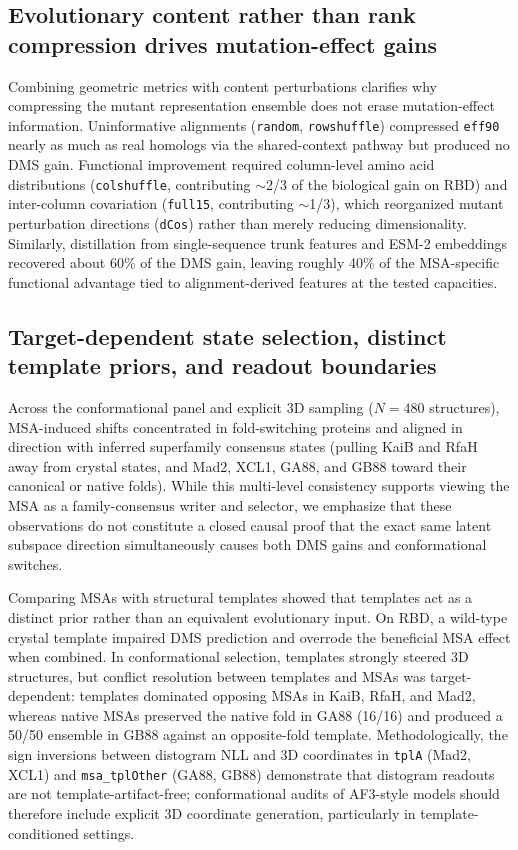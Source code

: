 \documentclass[10pt,a4paper]{article}
\begin{document}
\subsection{Evolutionary content rather than rank compression drives mutation-effect gains}
Combining geometric metrics with content perturbations clarifies why compressing the mutant representation ensemble does not erase mutation-effect information. Uninformative alignments (\texttt{random}, \texttt{rowshuffle}) compressed \texttt{eff90} nearly as much as real homologs via the shared-context pathway but produced no DMS gain. Functional improvement required column-level amino acid distributions (\texttt{colshuffle}, contributing $\sim$2/3 of the biological gain on RBD) and inter-column covariation (\texttt{full15}, contributing $\sim$1/3), which reorganized mutant perturbation directions (\texttt{dCos}) rather than merely reducing dimensionality. Similarly, distillation from single-sequence trunk features and ESM-2 embeddings recovered about 60\% of the DMS gain, leaving roughly 40\% of the MSA-specific functional advantage tied to alignment-derived features at the tested capacities.

\subsection{Target-dependent state selection, distinct template priors, and readout boundaries}
Across the conformational panel and explicit 3D sampling ($N=480$ structures), MSA-induced shifts concentrated in fold-switching proteins and aligned in direction with inferred superfamily consensus states (pulling KaiB and RfaH away from crystal states, and Mad2, XCL1, GA88, and GB88 toward their canonical or native folds). While this multi-level consistency supports viewing the MSA as a family-consensus writer and selector, we emphasize that these observations do not constitute a closed causal proof that the exact same latent subspace direction simultaneously causes both DMS gains and conformational switches.

Comparing MSAs with structural templates showed that templates act as a distinct prior rather than an equivalent evolutionary input. On RBD, a wild-type crystal template impaired DMS prediction and overrode the beneficial MSA effect when combined. In conformational selection, templates strongly steered 3D structures, but conflict resolution between templates and MSAs was target-dependent: templates dominated opposing MSAs in KaiB, RfaH, and Mad2, whereas native MSAs preserved the native fold in GA88 (16/16) and produced a 50/50 ensemble in GB88 against an opposite-fold template. Methodologically, the sign inversions between distogram NLL and 3D coordinates in \texttt{tplA} (Mad2, XCL1) and \texttt{msa\_tplOther} (GA88, GB88) demonstrate that distogram readouts are not template-artifact-free; conformational audits of AF3-style models should therefore include explicit 3D coordinate generation, particularly in template-conditioned settings.
\end{document}
